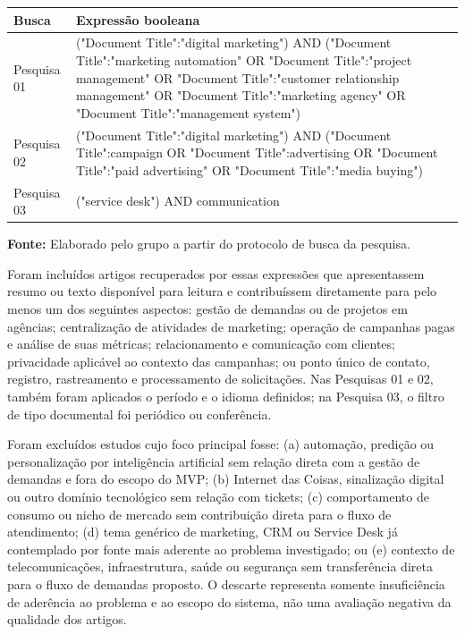 \begin{quadro}[H]
\centering
\caption{Expressões de busca utilizadas na IEEE Xplore}
\label{qua:buscas-ieee}
\small
\begin{tabular}{p{}p{}}
\hline
\textbf{Busca} & \textbf{Expressão booleana} \\
\hline
Pesquisa 01 & \ttfamily ("Document Title":"digital marketing") AND ("Document Title":"marketing automation" OR "Document Title":"project management" OR "Document Title":"customer relationship management" OR "Document Title":"marketing agency" OR "Document Title":"management system") \\
\normalfont Pesquisa 02 & \ttfamily ("Document Title":"digital marketing") AND ("Document Title":campaign OR "Document Title":advertising OR "Document Title":"paid advertising" OR "Document Title":"media buying") \\
\normalfont Pesquisa 03 & \ttfamily ("service desk") AND communication \\
\hline
\end{tabular}
\par\footnotesize\normalfont\textbf{Fonte:} Elaborado pelo grupo a partir do protocolo de busca da pesquisa.
\end{quadro}

Foram incluídos artigos recuperados por essas expressões que apresentassem resumo ou texto disponível para leitura e contribuíssem diretamente para pelo menos um dos seguintes aspectos: gestão de demandas ou de projetos em agências; centralização de atividades de marketing; operação de campanhas pagas e análise de suas métricas; relacionamento e comunicação com clientes; privacidade aplicável ao contexto das campanhas; ou ponto único de contato, registro, rastreamento e processamento de solicitações. Nas Pesquisas 01 e 02, também foram aplicados o período e o idioma definidos; na Pesquisa 03, o filtro de tipo documental foi periódico ou conferência.

Foram excluídos estudos cujo foco principal fosse: (a) automação, predição ou personalização por inteligência artificial sem relação direta com a gestão de demandas e fora do escopo do MVP; (b) Internet das Coisas, sinalização digital ou outro domínio tecnológico sem relação com tickets; (c) comportamento de consumo ou nicho de mercado sem contribuição direta para o fluxo de atendimento; (d) tema genérico de marketing, CRM ou Service Desk já contemplado por fonte mais aderente ao problema investigado; ou (e) contexto de telecomunicações, infraestrutura, saúde ou segurança sem transferência direta para o fluxo de demandas proposto. O descarte representa somente insuficiência de aderência ao problema e ao escopo do sistema, não uma avaliação negativa da qualidade dos artigos.

